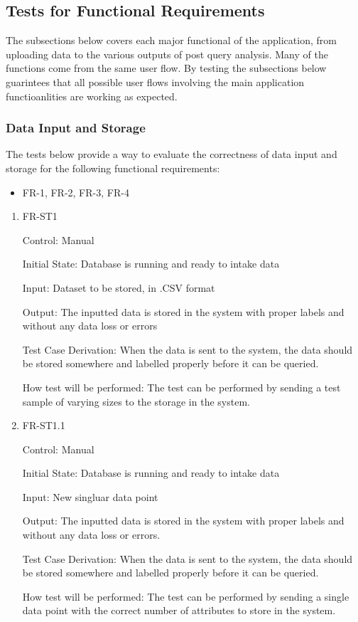 \documentclass[12pt, titlepage]{article}
\begin{document}
\subsection{Tests for Functional Requirements}

The subsections below covers each major functional of the application, from
uploading data to the various outputs of post query analysis. Many of the
functions come from the same user flow. By testing the subsections below
guarintees that all possible user flows involving the main application
functioanlities are working as expected. 

\subsubsection{Data Input and Storage}
The tests below provide a way to evaluate the correctness of data input and
storage for the following functional requirements:
\begin{itemize}
  \item FR-1, FR-2, FR-3, FR-4
\end{itemize}

\begin{enumerate}

\item{FR-ST1}

Control: Manual
					
Initial State: Database is running and ready to intake data
					
Input: Dataset to be stored, in .CSV format
					
Output: The inputted data is stored in the system with proper labels and without
any data loss or errors

Test Case Derivation: When the data is sent to the system, the data should be
stored somewhere and labelled properly before it can be queried.
					
How test will be performed: The test can be performed by sending a test sample
of varying sizes to the storage in the system.

\item {FR-ST1.1}

Control: Manual
					
Initial State: Database is running and ready to intake data
					
Input: New singluar data point 
					
Output: The inputted data is stored in the system with proper labels and without
any data loss or errors.

Test Case Derivation: When the data is sent to the system, the data should be
stored somewhere and labelled properly before it can be queried.
					
How test will be performed: The test can be performed by sending a single data
point with the correct number of attributes to store in the system.

\end{enumerate}
\end{document}
